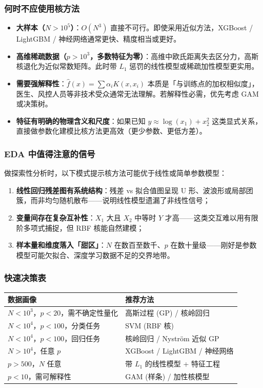 \subsubsection{何时不应使用核方法}

\begin{itemize}
    \item \textbf{大样本（$N > 10^5$）}：$O(N^3)$ 直接不可行。即使采用近似方法，XGBoost / LightGBM / 神经网络通常更快、精度相当或更好。
    \item \textbf{高维稀疏数据（$p > 10^3$，多数特征为零）}：高维中欧氏距离失去区分力，高斯核退化为近似常数矩阵。此时带 $L_1$ 惩罚的线性模型或稀疏加性模型更实用。
    \item \textbf{需要强解释性}：$\hat{f}(x) = \sum \alpha_i K(x, x_i)$ 本质是「与训练点的加权相似度」，医生、风控人员等非技术受众通常无法理解。若解释性必需，优先考虑 GAM 或决策树。
    \item \textbf{特征有明确的物理含义和尺度}：如果已知 $y \approx \log(x_1) + x_2^2$ 这类显式关系，直接做参数化建模比核方法更高效（更少参数、更低方差）。
\end{itemize}

\subsubsection{EDA 中值得注意的信号}

做探索性分析时，以下模式提示核方法可能优于线性或简单参数模型：

\begin{enumerate}
    \item \textbf{线性回归残差图有系统结构}：残差 vs 拟合值图呈现 U 形、波浪形或局部团簇，而非均匀随机散布——说明线性模型遗漏了非线性信号；
    \item \textbf{变量间存在复杂互补性}：$X_1$ 大且 $X_2$ 中等时 $Y$ 才高——这类交互难以用有限阶多项式捕捉，但 RBF 核能自然建模；
    \item \textbf{样本量和维度落入「甜区」}：$N$ 在数百至数千、$p$ 在数十量级——刚好是参数模型可能欠拟合、深度学习数据不足的交界地带。
\end{enumerate}

\subsubsection{快速决策表}

\begin{center}
\begin{tabular}{ll}
\toprule
数据画像 & 推荐方法 \\
\midrule
$N < 10^3$，$p < 20$，需不确定性量化 & 高斯过程 (GP) / 核岭回归 \\
$N < 10^4$，$p < 100$，分类任务 & SVM (RBF 核) \\
$N < 10^4$，$p < 100$，回归任务 & 核岭回归 / Nyström 近似 GP \\
$N > 10^4$，任意 $p$ & XGBoost / LightGBM / 神经网络 \\
$p > 500$，$N$ 任意 & 带 $L_1$ 的线性模型 + 特征工程 \\
$p < 10$，需可解释性 & GAM (样条) / 加性核模型 \\
\bottomrule
\end{tabular}
\end{center}


